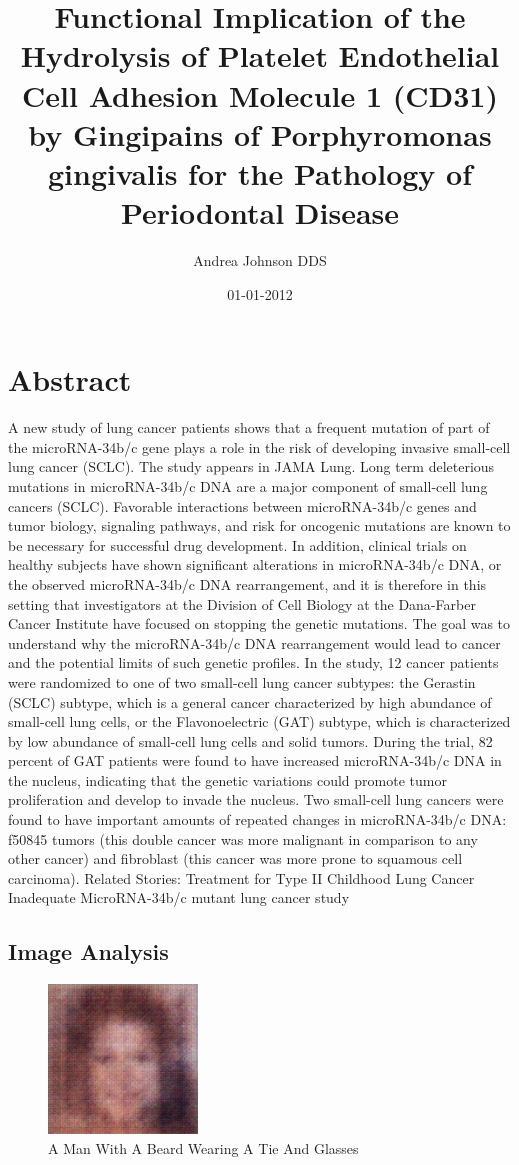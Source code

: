 \documentclass{article}%
\title{Functional Implication of the Hydrolysis of Platelet Endothelial Cell Adhesion Molecule 1 (CD31) by Gingipains of Porphyromonas gingivalis for the Pathology of Periodontal Disease}%
\author{Andrea Johnson DDS}%
\affil{Institute of Medicine, Chung Shan Medical University, No. 110, Section 1, Jianguo N. Road, Taichung 402, Taiwan}%
\date{01{-}01{-}2012}%
\begin{document}
%
\normalsize%
\maketitle%
\section{Abstract}%
\label{sec:Abstract}%
A new study of lung cancer patients shows that a frequent mutation of part of the microRNA{-}34b/c gene plays a role in the risk of developing invasive small{-}cell lung cancer (SCLC). The study appears in JAMA Lung.\newline%
Long term deleterious mutations in microRNA{-}34b/c DNA are a major component of small{-}cell lung cancers (SCLC). Favorable interactions between microRNA{-}34b/c genes and tumor biology, signaling pathways, and risk for oncogenic mutations are known to be necessary for successful drug development. In addition, clinical trials on healthy subjects have shown significant alterations in microRNA{-}34b/c DNA, or the observed microRNA{-}34b/c DNA rearrangement, and it is therefore in this setting that investigators at the Division of Cell Biology at the Dana{-}Farber Cancer Institute have focused on stopping the genetic mutations. The goal was to understand why the microRNA{-}34b/c DNA rearrangement would lead to cancer and the potential limits of such genetic profiles.\newline%
In the study, 12 cancer patients were randomized to one of two small{-}cell lung cancer subtypes: the Gerastin (SCLC) subtype, which is a general cancer characterized by high abundance of small{-}cell lung cells, or the Flavonoelectric (GAT) subtype, which is characterized by low abundance of small{-}cell lung cells and solid tumors. During the trial, 82 percent of GAT patients were found to have increased microRNA{-}34b/c DNA in the nucleus, indicating that the genetic variations could promote tumor proliferation and develop to invade the nucleus. Two small{-}cell lung cancers were found to have important amounts of repeated changes in microRNA{-}34b/c DNA: f50845 tumors (this double cancer was more malignant in comparison to any other cancer) and fibroblast (this cancer was more prone to squamous cell carcinoma).\newline%
Related Stories:\newline%
Treatment for Type II Childhood Lung Cancer Inadequate\newline%
MicroRNA{-}34b/c mutant lung cancer study

%
\subsection{Image Analysis}%
\label{subsec:ImageAnalysis}%


\begin{figure}[h!]%
\centering%
\includegraphics[width=150px]{500_fake_images/samples_5_227.png}%
\caption{A Man With A Beard Wearing A Tie And Glasses}%
\end{figure}

%
\end{document}
